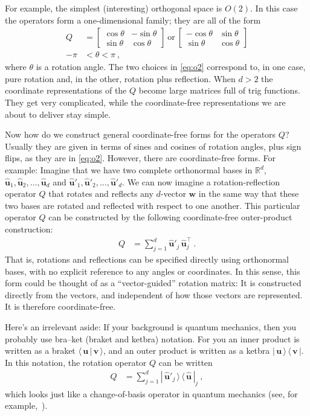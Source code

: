 \documentclass{article}
\newcommand{\Evec}[1]{{\mathbf{#1}}} %
\newcommand{\Ehat}[1]{{\mathbf{\hat{#1}}}} %
\newcommand{\braket}[2]{\langle\,{#1}\,|\,{#2}\,\rangle}
\newcommand{\ketbra}[2]{|\,{#1}\,\rangle\,\langle\,{#2}\,|}
\begin{document}
For example, the simplest (interesting) orthogonal space is $O(2)$. In this case the operators form a one-dimensional family; they are all of the form
\begin{align}
    Q &= \begin{bmatrix}\cos{\theta} & -\sin{\theta} \\ \sin{\theta} & \cos{\theta}\end{bmatrix} ~\mbox{or}~
    \begin{bmatrix}-\cos{\theta} & \sin{\theta} \\ \sin{\theta} & \cos{\theta}\end{bmatrix} \label{eq:o2}
    \\
    -\pi &< \theta < \pi ~, \nonumber
\end{align}
where $\theta$ is a rotation angle.
The two choices in \eqref{eq:o2} correspond to, in one case, pure rotation and, in the other, rotation plus reflection.
When $d>2$ the coordinate representations of the $Q$ become large matrices full of trig functions.
They get very complicated, while the coordinate-free representations we are about to deliver stay simple.

Now how do we construct general coordinate-free forms for the operators $Q$?
Usually they are given in terms of sines and cosines of rotation angles, plus sign flips, as they are in \eqref{eq:o2}.
However, there are coordinate-free forms.
For example: Imagine that we have two complete orthonormal bases in $\mathbb{R}^d$, $\Ehat{u}_1,\Ehat{u}_2,\ldots,\Ehat{u}_d$ and $\Ehat{u}'_1,\Ehat{u}'_2,\ldots,\Ehat{u}'_d$.
We can now imagine a rotation-reflection operator $Q$ that rotates and reflects any $d$-vector $\Evec{w}$ in the same way that these two bases are rotated and reflected with respect to one another.
This particular operator $Q$ can be constructed by the following coordinate-free outer-product construction:
\begin{align}
    Q &= \sum_{j=1}^d \Ehat{u}'_j\,\Ehat{u}_j^\top ~.\label{eq:rotationoperator}
\end{align}
That is, rotations and reflections can be specified directly using orthonormal bases, with no explicit reference to any angles or coordinates.
In this sense, this form could be thought of as a ``vector-guided'' rotation matrix:
It is constructed directly from the vectors, and independent of how those vectors are represented.
It is therefore coordinate-free.

Here's an irrelevant aside:
If your background is quantum mechanics, then you probably use bra--ket (braket and ketbra) notation.
For you an inner product is written as a braket $\braket{\Evec{u}}{\Evec{v}}$, and an outer product is written as a ketbra $\ketbra{\Evec{u}}{\Evec{v}}$.
In this notation, the rotation operator $Q$ can be written 
\begin{align}
    Q &= \sum_{j=1}^d \ketbra{\Ehat{u}'_j}{\Ehat{u}}_j ~,
\end{align}
which looks just like a change-of-basis operator in quantum mechanics (see, for example,~\cite{quantumtextbook}).
\end{document}
